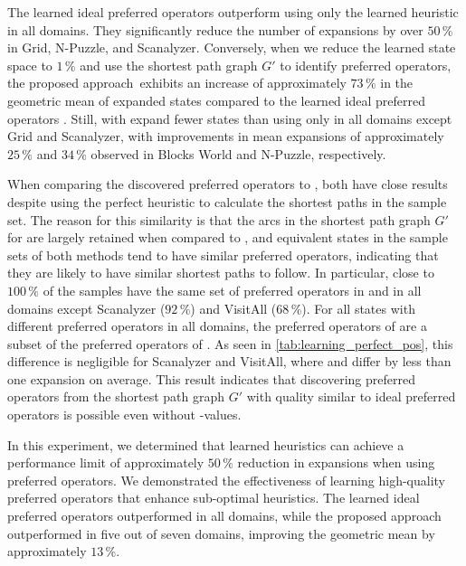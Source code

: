 \documentclass[ppgc,diss,english]{iiufrgs}
\begin{document}
The learned ideal preferred operators \postar outperform using only the learned heuristic \hnn in all domains. They significantly reduce the number of expansions by over $50\,\%$ in Grid, N-Puzzle, and Scanalyzer. Conversely, when we reduce the learned state space to $1\,\%$ and use the shortest path graph $G'$ to identify preferred operators, the proposed approach~\pog exhibits an increase of approximately $73\,\%$ in the geometric mean of expanded states compared to the learned ideal preferred operators \postar. Still, \hnn with \pog expand fewer states than using only \hnn in all domains except Grid and Scanalyzer, with improvements in mean expansions of approximately $25\,\%$ and $34\,\%$ observed in Blocks World and N-Puzzle, respectively.


When comparing the discovered preferred operators \pogstar to \pog, both have close results despite \pogstar using the perfect heuristic \hstar to calculate the shortest paths in the sample set. The reason for this similarity is that the arcs in the shortest path graph $G'$ for \pog are largely retained when compared to \pogstar, and equivalent states in the sample sets of both methods tend to have similar preferred operators, indicating that they are likely to have similar shortest paths to follow. In particular, close to $100\,\%$ of the samples have the same set of preferred operators in \pogstar and \pog in all domains except Scanalyzer ($92\,\%$) and VisitAll ($68\,\%$). For all states with different preferred operators in all domains, the preferred operators of \pog are a subset of the preferred operators of \pogstar. As seen in \cref{tab:learning_perfect_pos}, this difference is negligible for Scanalyzer and VisitAll, where \pogstar and \pog differ by less than one expansion on average. This result indicates that discovering preferred operators from the shortest path graph $G'$ with quality similar to ideal preferred operators is possible even without \hstar-values.

In this experiment, we determined that learned heuristics can achieve a performance limit of approximately $50\,\%$ reduction in expansions when using preferred operators. We demonstrated the effectiveness of learning high-quality preferred operators that enhance sub-optimal heuristics. The learned ideal preferred operators \postar outperformed \hnn in all domains, while the proposed approach \pog outperformed \hnn in five out of seven domains, improving the geometric mean by approximately $13\,\%$.
\end{document}
